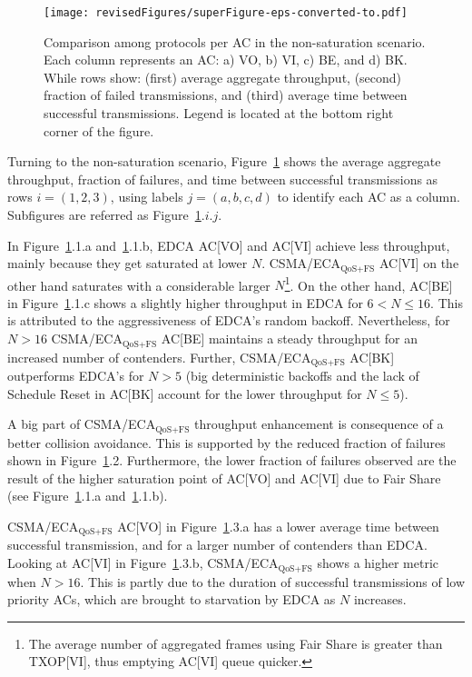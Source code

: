 \documentclass[a4paper]{article}
\begin{document}
	\begin{figure}[t]
	\centering
		\texttt{[image: revisedFigures/superFigure-eps-converted-to.pdf]}
		\caption{Comparison among protocols per AC in the non-saturation scenario. Each column represents an AC: a) VO, b) VI, c) BE, and d) BK. While rows show: (first) average aggregate throughput, (second) fraction of failed transmissions, and (third) average time between successful transmissions. Legend is located at the bottom right corner of the figure.}
		\label{fig:unsat}
	\end{figure}

Turning to the non-saturation scenario, Figure~\ref{fig:unsat} shows the average aggregate throughput, fraction of failures, and time between successful transmissions as rows $i=(1, 2, 3)$, using labels $j=(a,b,c,d)$ to identify each AC as a column. Subfigures are referred as Figure~\ref{fig:unsat}$.i.j$. 

In Figure~\ref{fig:unsat}.1.a and~\ref{fig:unsat}.1.b, EDCA AC[VO] and AC[VI] achieve less throughput, mainly because they get saturated at lower $N$. CSMA/ECA$_{\text{QoS+FS}}$ AC[VI] on the other hand saturates with a considerable larger $N$\footnote{The average number of aggregated frames using Fair Share is greater than TXOP[VI], thus emptying AC[VI] queue quicker.}. On the other hand, AC[BE] in Figure~\ref{fig:unsat}.1.c shows a slightly higher throughput in EDCA for $6<N\le 16$. This is attributed to the aggressiveness of EDCA's random backoff. Nevertheless, for $N>16$ CSMA/ECA$_{\text{QoS+FS}}$ AC[BE] maintains a steady throughput for an increased number of contenders. Further, CSMA/ECA$_{\text{QoS+FS}}$ AC[BK] outperforms EDCA's for $N>5$ (big deterministic backoffs and the lack of Schedule Reset in AC[BK] account for the lower throughput for $N\le 5$).



A big part of CSMA/ECA$_{\text{QoS+FS}}$ throughput enhancement is consequence of a better collision avoidance. This is supported by the reduced fraction of failures shown in Figure~\ref{fig:unsat}.2. Furthermore, the lower fraction of failures observed are the result of the higher saturation point of AC[VO] and AC[VI] due to Fair Share (see Figure~\ref{fig:unsat}.1.a and~\ref{fig:unsat}.1.b).
	
CSMA/ECA$_{\text{QoS+FS}}$ AC[VO] in Figure~\ref{fig:unsat}.3.a has a lower average time between successful transmission, and for a larger number of contenders than EDCA. Looking at AC[VI] in Figure~\ref{fig:unsat}.3.b, CSMA/ECA$_{\text{QoS+FS}}$ shows a higher metric when $N>16$. This is partly due to the duration of successful transmissions of low priority ACs, which are brought to starvation by EDCA as $N$ increases. 
\end{document}
